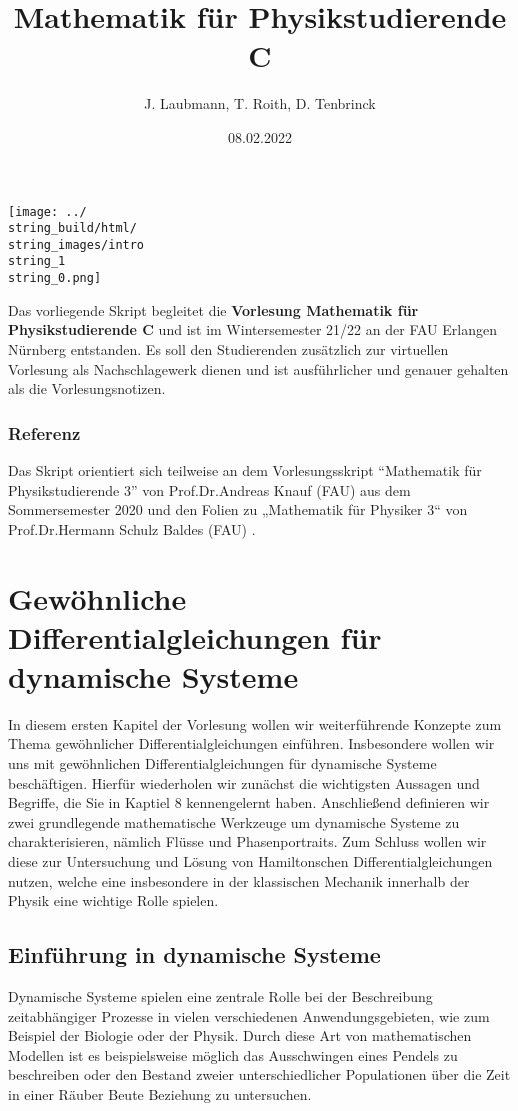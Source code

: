\documentclass[letterpaper,10pt,german]{jupyterBook}
\title{Mathematik für Physikstudierende C}
\date{08.02.2022}
\author{J.\@{} Laubmann, T.\@{} Roith, D.\@{} Tenbrinck}
\begin{document}
\label{\detokenize{intro::doc}}



\noindent\texttt{[image: ../\\string\_build/html/\\string\_images/intro\\string\_1\\string\_0.png]}


\par
Das vorliegende Skript begleitet die \textbf{Vorlesung Mathematik für Physikstudierende C} und ist im Wintersemester 21/22 an der FAU Erlangen Nürnberg entstanden. Es soll den Studierenden zusätzlich zur virtuellen Vorlesung als Nachschlagewerk dienen und ist ausführlicher und genauer gehalten als die Vorlesungsnotizen.

\subsection{Referenz}

\par
Das Skript orientiert sich teilweise an dem Vorlesungsskript “Mathematik für Physikstudierende 3” \cite{Kna20} von Prof.Dr.Andreas Knauf (FAU) aus dem Sommersemester 2020 und den Folien zu „Mathematik für Physiker 3“ von Prof.Dr.Hermann Schulz Baldes (FAU) \cite{SB18}.


\chapter{Gewöhnliche Differentialgleichungen für dynamische Systeme}
\label{\detokenize{ode/ode:gewohnliche-differentialgleichungen-fur-dynamische-systeme}}\label{\detokenize{ode/ode::doc}}
\par
In diesem ersten Kapitel der Vorlesung wollen wir weiterführende Konzepte zum Thema gewöhnlicher Differentialgleichungen einführen.
Insbesondere wollen wir uns mit gewöhnlichen Differentialgleichungen für dynamische Systeme beschäftigen.
Hierfür wiederholen wir zunächst die wichtigsten Aussagen und Begriffe, die Sie in Kaptiel 8 \cite{Ten21} kennengelernt haben.
Anschließend definieren wir zwei grundlegende mathematische Werkzeuge um dynamische Systeme zu charakterisieren, nämlich Flüsse und Phasenportraits.
Zum Schluss wollen wir diese zur Untersuchung und Lösung von Hamiltonschen Differentialgleichungen nutzen, welche eine insbesondere in der klassischen Mechanik innerhalb der Physik eine wichtige Rolle spielen.


\section{Einführung in dynamische Systeme}
\label{\detokenize{ode/dynamicSystems:einfuhrung-in-dynamische-systeme}}\label{\detokenize{ode/dynamicSystems::doc}}
\par
Dynamische Systeme spielen eine zentrale Rolle bei der Beschreibung zeitabhängiger Prozesse in vielen verschiedenen Anwendungsgebieten, wie zum Beispiel der Biologie oder der Physik.
Durch diese Art von mathematischen Modellen ist es beispielsweise möglich das Ausschwingen eines Pendels zu beschreiben oder den Bestand zweier unterschiedlicher Populationen über die Zeit in einer Räuber Beute Beziehung zu untersuchen.
\end{document}
